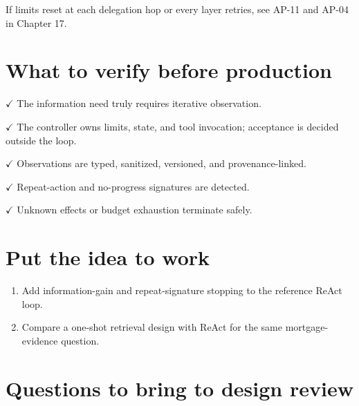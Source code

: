 If limits reset at each delegation hop or every layer retries, see AP-11 and AP-04 in Chapter 17.\par

\section{What to verify before production}

\textbf{\ensuremath{\checkmark}} The information need truly requires iterative observation.\par

\textbf{\ensuremath{\checkmark}} The controller owns limits, state, and tool invocation; acceptance is decided outside the loop.\par

\textbf{\ensuremath{\checkmark}} Observations are typed, sanitized, versioned, and provenance-linked.\par

\textbf{\ensuremath{\checkmark}} Repeat-action and no-progress signatures are detected.\par

\textbf{\ensuremath{\checkmark}} Unknown effects or budget exhaustion terminate safely.\par

\section{Put the idea to work}

\begin{enumerate}

\item Add information-gain and repeat-signature stopping to the reference ReAct loop.

\item Compare a one-shot retrieval design with ReAct for the same mortgage-evidence question.

\end{enumerate}

\section{Questions to bring to design review}

